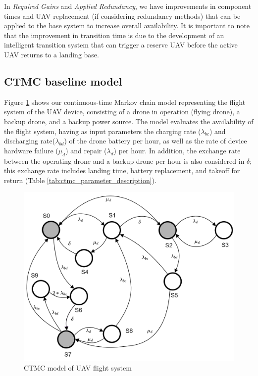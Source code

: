 \documentclass[conference]{IEEEtran}
\begin{document}
In \textit{Required Gains} and \textit{Applied Redundancy}, we have improvements in component times and UAV replacement (if considering redundancy methods) that can be applied to the base system to increase overall availability. It is important to note that the improvement in transition time is due to the development of an intelligent transition system that can trigger a reserve UAV before the active UAV returns to a landing base.

\subsection{CTMC baseline model}

Figure \ref{fig:ctmc_model} shows our continuous-time Markov chain model representing the flight system of the UAV device, consisting of a drone in operation (flying drone), a backup drone, and a backup power source. The model evaluates the availability of the flight system, having as input parameters the charging rate ($\lambda_{bc}$) and discharging rate($\lambda_{bd}$) of the drone battery per hour, as well as the rate of device hardware failure ($\mu_{d}$) and repair ($\lambda_{d}$) per hour. In addition, the exchange rate between the operating drone and a backup drone per hour is also considered in $\delta$; this exchange rate includes landing time, battery replacement, and takeoff for return (Table \ref{tab:ctmc_parameter_description}).

\begin{figure}[htbp]
\centerline{\includegraphics[scale=0.75]{img/CTMC_transparent.png}}
\caption{CTMC model of UAV flight system}
\label{fig:ctmc_model}
\end{figure}
\end{document}
